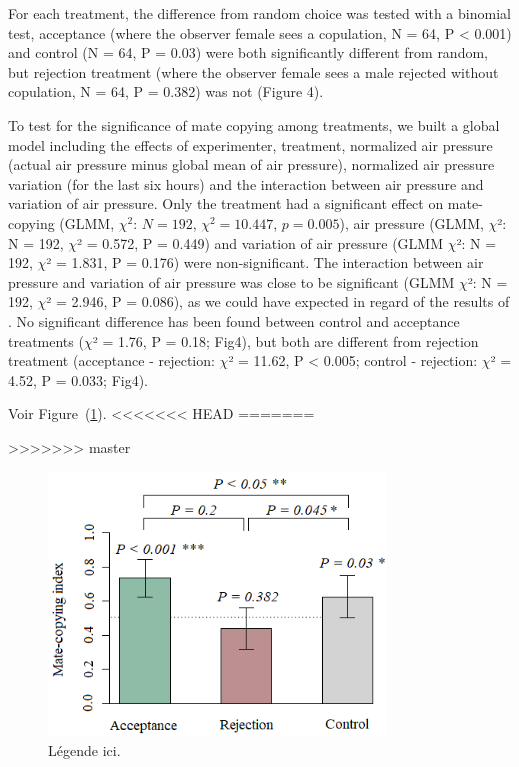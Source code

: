 \documentclass[a4paper, 12pt]{article}
\begin{document}
	For each treatment, the difference from random choice was tested with a binomial test, acceptance (where the observer female sees a copulation, N = 64, P {\textless} 0.001) and control (N = 64, P = 0.03) were both significantly different from random, but rejection treatment (where the observer female sees a male rejected without copulation, N = 64, P = 0.382) was not (Figure 4).

	To test for the significance of mate copying among treatments, we built a global model including the effects of experimenter, treatment, normalized air pressure (actual air pressure minus global mean of air pressure), normalized air pressure variation (for the last six hours) and the interaction between air pressure and variation of air pressure. Only the treatment had a significant effect on mate-copying (GLMM, $\chi^2$: $N = 192$, $\chi^2 = 10.447$, $p = 0.005$), air pressure (GLMM, $\chi $²: N = 192, $\chi $² = 0.572, P = 0.449) and variation of air pressure (GLMM $\chi $²: N = 192, $\chi $² = 1.831, P = 0.176) were non-significant. The interaction between air pressure and variation of air pressure was close to be significant (GLMM $\chi $²: N = 192, $\chi $² = 2.946, P = 0.086), as we could have expected in regard of the results of \textcite{dagaeff_drosophila_2016}. No significant difference has been found between control and acceptance treatments ($\chi $² = 1.76, P = 0.18; Fig4), but both are different from rejection treatment (acceptance - rejection: $\chi $² = 11.62, P {\textless} 0.005; control - rejection: $\chi $² = 4.52, P = 0.033; Fig4).
	
	Voir Figure~(\ref{fig:mcsar}).
<<<<<<< HEAD
=======

>>>>>>> master

	\begin{figure}
	\centering
	\includegraphics[width=0.8\textwidth]{images/mcsar}
	\caption{Légende ici.}
	\label{fig:mcsar}
\end{figure}


\clearpage
\newrefcontext[sorting=nyt] %
\printbibliography
\end{document}

